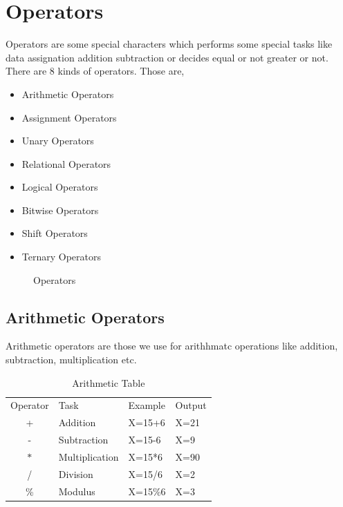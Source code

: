 \documentclass[openany]{book}  %
\begin{document}
\chapter{Operators}
Operators\cite{Ref8} are some special characters which performs some special tasks like \\
data assignation addition subtraction or decides equal or not greater or not. \\
There are 8 kinds of operators. Those are,
\begin{itemize}
    \item Arithmetic Operators
    \item Assignment Operators
    \item Unary Operators
    \item Relational Operators
    \item Logical Operators
    \item Bitwise Operators
    \item Shift Operators
    \item Ternary Operators
\end{itemize}
% 
%
\begin{figure}[htbp]
    \begin{center}
        \caption{Operators\cite{Ref8}}
    \end{center}
\end{figure}
% 
% 
\section{Arithmetic Operators}
Arithmetic operators\cite{Ref8} are those we use for arithhmatc operations like addition, subtraction, multiplication etc.
% 
% 
\begin{table}[htbp]
    \begin{tabular}{clll}
        \multicolumn{1}{l}{Operator} & Task           & Example & Output \\
        +                            & Addition       & X=15+6  & X=21   \\
        -                            & Subtraction    & X=15-6  & X=9    \\
        $*$                          & Multiplication & X=15*6  & X=90   \\
        /                            & Division       & X=15/6  & X=2    \\
        \%                           & Modulus        & X=15\%6 & X=3
    \end{tabular}
    \centering
    \caption{Arithmetic Table}
\end{table}
% 
% 
\end{document}
